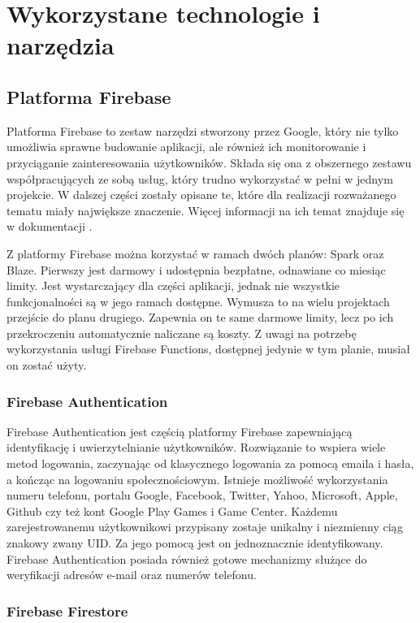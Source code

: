 \chapter{Wykorzystane technologie i narzędzia}

\section{Platforma Firebase}
Platforma Firebase to zestaw narzędzi stworzony przez Google, który nie tylko umożliwia sprawne budowanie aplikacji, ale również ich monitorowanie i przyciąganie zainteresowania użytkowników. Składa się ona z obszernego zestawu współpracujących ze sobą usług, który trudno wykorzystać w pełni w jednym projekcie. W dalszej części zostały opisane te, które dla realizacji rozważanego tematu miały największe znaczenie. Więcej informacji na ich temat znajduje się w dokumentacji \cite{firebase-docs}.

Z platformy Firebase można korzystać w ramach dwóch planów: Spark oraz Blaze. Pierwszy jest darmowy i udostępnia bezpłatne, odnawiane co miesiąc limity. Jest wystarczający dla części aplikacji, jednak nie wszystkie funkcjonalności są w jego ramach dostępne. Wymusza to na wielu projektach przejście do planu drugiego. Zapewnia on te same darmowe limity, lecz po ich przekroczeniu automatycznie naliczane są koszty. Z uwagi na potrzebę wykorzystania usługi Firebase Functions, dostępnej jedynie w tym planie, musiał on zostać użyty.

\subsection{Firebase Authentication}
\label{technologie-authentication}
Firebase Authentication jest częścią platformy Firebase zapewniającą identyfikację i uwierzytelnianie użytkowników. 
Rozwiązanie to wspiera wiele metod logowania, zaczynając od klasycznego logowania za pomocą emaila i hasła, a kończąc na logowaniu społecznościowym. Istnieje możliwość wykorzystania numeru telefonu, portalu Google, Facebook, Twitter, Yahoo, Microsoft, Apple, Github czy też kont Google Play Games i Game Center. Każdemu zarejestrowanemu użytkownikowi przypisany zostaje unikalny i niezmienny ciąg znakowy zwany UID. Za jego pomocą jest on jednoznacznie identyfikowany. Firebase Authentication posiada również gotowe mechanizmy służące do weryfikacji adresów e-mail oraz numerów telefonu. 

\subsection{Firebase Firestore}
\label{technologie-firestore}

